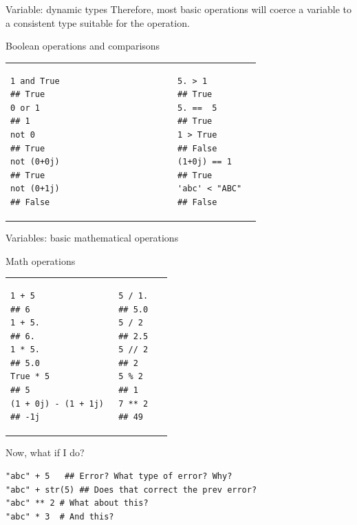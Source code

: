 \documentclass[10pt]{beamer}
\begin{document}
\begin{frame}[fragile]{Variable: dynamic types}  %
Therefore, most basic operations will coerce a variable to a consistent type suitable for the operation.

\begin{block}{Boolean operations and comparisons}
\vspace{-0.5cm}
\begin{table}
	\centering
\begin{tabular}{p{5cm}p{5cm}p{5cm}}
\begin{lstlisting}[style=mypython]
1 and True
## True	
0 or 1
## 1 
not 0
## True	
not (0+0j)
## True	
not (0+1j)
## False						
\end{lstlisting}&
\begin{lstlisting}[style=mypython, numbers=none]
5. > 1
## True
5. ==  5 
## True
1 > True
## False
(1+0j) == 1
## True
'abc' < "ABC"
## False 
\end{lstlisting}
\end{tabular}
\end{table}
\end{block}
\end{frame}
\begin{frame}[fragile]{Variables: basic mathematical operations}

\begin{block}{Math operations}
\vspace{-0.85cm}
\begin{table}
	\centering		
\begin{tabular}{p{5cm}p{5cm}p{5cm}}
\begin{lstlisting}[style=mypython]
1 + 5
## 6
1 + 5.
## 6.
1 * 5.
## 5.0
True * 5
## 5
(1 + 0j) - (1 + 1j)	
## -1j 			
\end{lstlisting}&
\begin{lstlisting}[style=mypython, numbers=none]
5 / 1.
## 5.0
5 / 2
## 2.5
5 // 2 
## 2
5 % 2 
## 1
7 ** 2
## 49 
\end{lstlisting}
\end{tabular}
\end{table}
\vspace{-0.9cm}
Now, what if I do? 
\begin{lstlisting}[style=mypython]
"abc" + 5  	## Error? What type of error? Why? 
"abc" + str(5) ## Does that correct the prev error?
"abc" ** 2 # What about this? 
"abc" * 3  # And this?
\end{lstlisting}
\end{block}

\end{frame}
\end{document}
